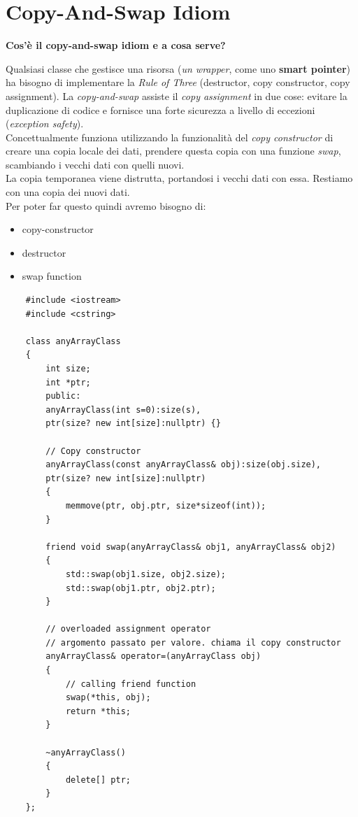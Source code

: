 \section{Copy-And-Swap Idiom}

\textsf{\small \textbf{Cos'è il \textbf{copy-and-swap idiom} e a cosa serve?}} \break

\textsf{\small Qualsiasi classe che gestisce una risorsa (\emph{un wrapper}, come uno \textbf{smart pointer}) ha bisogno di implementare la \emph{Rule of Three} (destructor, copy constructor, copy assignment). La \emph{copy-and-swap} assiste il \emph{copy assignment} in due cose: evitare la duplicazione di codice e fornisce una forte sicurezza a livello di eccezioni (\emph{exception safety}).} \\

\textsf{\small Concettualmente funziona utilizzando la funzionalità del \emph{copy constructor} di creare una copia locale dei dati, prendere questa copia con una funzione \emph{swap}, scambiando i vecchi dati con quelli nuovi.} \\

\textsf{\small La copia temporanea viene distrutta, portandosi i vecchi dati con essa. Restiamo con una copia dei nuovi dati.} \\

\textsf{\small Per poter far questo quindi avremo bisogno di: } \\

\begin{itemize}
	\item \textsf{\small copy-constructor}
	\item \textsf{\small destructor}
	\item \textsf{\small swap function}
\end{itemize}

\begin{lstlisting}
	#include <iostream>
	#include <cstring>
	
	class anyArrayClass
	{
		int size;
		int *ptr;
		public:
		anyArrayClass(int s=0):size(s),
		ptr(size? new int[size]:nullptr) {}
		
		// Copy constructor
		anyArrayClass(const anyArrayClass& obj):size(obj.size),
		ptr(size? new int[size]:nullptr)
		{
			memmove(ptr, obj.ptr, size*sizeof(int));
		}
		
		friend void swap(anyArrayClass& obj1, anyArrayClass& obj2)
		{
			std::swap(obj1.size, obj2.size);
			std::swap(obj1.ptr, obj2.ptr);
		}
		
		// overloaded assignment operator
		// argomento passato per valore. chiama il copy constructor
		anyArrayClass& operator=(anyArrayClass obj)	
		{
			// calling friend function
			swap(*this, obj);
			return *this;
		}
		
		~anyArrayClass()
		{
			delete[] ptr;
		}
	};
\end{lstlisting}

